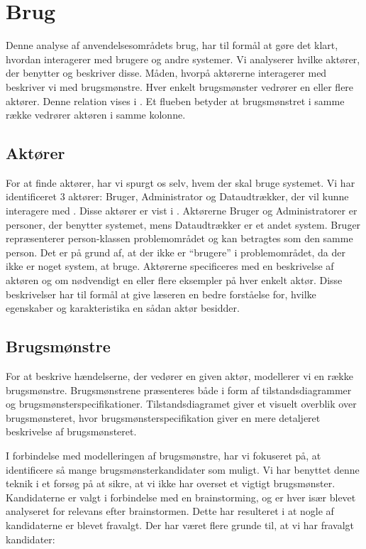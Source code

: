 \section{Brug}
\label{sec:brug}
Denne analyse af anvendelsesområdets brug, har til formål at gøre det klart, hvordan \Foodl{} interagerer med brugere og andre systemer. Vi analyserer hvilke aktører, der benytter \Foodl{} og beskriver disse. Måden, hvorpå aktørerne interagerer med \Foodl{} beskriver vi med brugsmønstre. Hver enkelt brugsmønster vedrører en eller flere aktører. Denne relation vises i . Et flueben betyder at brugsmønstret i samme række vedrører aktøren i samme kolonne.



\subsection{Aktører}
\label{sec:aktoerer}
For at finde aktører, har vi spurgt os selv, hvem der skal bruge systemet. Vi har identificeret 3 aktører: Bruger, Administrator og Dataudtrækker, der vil kunne interagere med \Foodl{}. Disse aktører er vist i . Aktørerne Bruger og Administratorer er personer, der benytter systemet, mens Dataudtrækker er et andet system. Bruger repræsenterer person-klassen problemområdet og kan betragtes som den samme person. Det er på grund af, at der ikke er ``brugere'' i problemområdet, da der ikke er noget system, at bruge. Aktørerne specificeres med en beskrivelse af aktøren og om nødvendigt en eller flere eksempler på hver enkelt aktør. Disse beskrivelser har til formål at give læseren en bedre forståelse for, hvilke egenskaber og karakteristika en sådan aktør besidder. 



\subsection{Brugsmønstre}
\label{subsec:brugsmoenstre}
For at beskrive hændelserne, der vedører en given aktør, modellerer vi en række brugsmønstre. Brugsmønstrene præsenteres både i form af  tilstandsdiagrammer og brugsmønsterspecifikationer. Tilstandsdiagramet giver et visuelt overblik over brugsmønsteret, hvor brugsmønsterspecifikation giver en mere detaljeret beskrivelse af brugsmønsteret.

I forbindelse med modelleringen af brugsmønstre, har vi fokuseret på, at identificere så mange brugsmønsterkandidater som muligt. Vi har benyttet denne teknik i et forsøg på at sikre, at vi ikke har overset et vigtigt brugsmønster. Kandidaterne er valgt i forbindelse med en brainstorming, og er hver især blevet analyseret for relevans efter brainstormen. Dette har resulteret i at nogle af kandidaterne er blevet fravalgt. Der har været flere grunde til, at vi har fravalgt kandidater:

